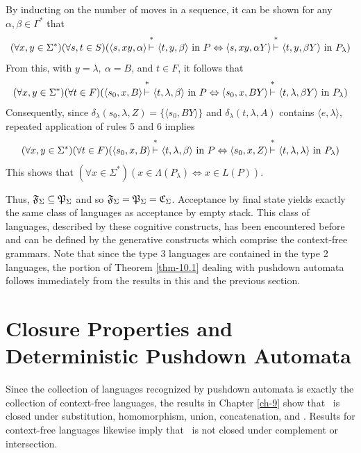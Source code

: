 \begin{thm}
By inducting on the number of moves in a sequence, it can be shown for any
$\alpha,\beta\in\Gamma^*$ that
\[ (\forall x,y\in\Sigma^*)(\forall s,t\in S)(\langle s,xy,\alpha\rangle\Dvdash
	\langle t,y,\beta\rangle\text{ in }P \Leftrightarrow \langle s,xy,\alpha Y\rangle
	\Dvdash\langle t,y,\beta Y\rangle\text{ in }P_{\lambda}) \]
From this, with $y=\lambda,\ \alpha = B$, and $t\in F$, it follows that
\[ (\forall x,y\in\Sigma^*)(\forall t\in F)(\langle s_0,x,B\rangle\Dvdash\langle
	t,\lambda,\beta\rangle\text{ in }P\Leftrightarrow\langle s_0,x,BY\rangle
	\Dvdash\langle t,\lambda,\beta Y\rangle\text{ in }P_{\lambda}) \]
Consequently, since $\delta_{\lambda}(s_0,\lambda,Z)=\{\langle s_0, BY\rangle\}$
and $\delta_{\lambda}(t,\lambda,A)$ contains $\langle e,\lambda\rangle$, repeated application
of rules 5 and 6 implies
\[ (\forall x,y\in\Sigma^*)(\forall t\in F)(\langle s_0,x,B\rangle\Dvdash\langle
	t,\lambda,\beta\rangle\text{ in }P\Leftrightarrow\langle s_0,x,Z\rangle\Dvdash
	\langle t,\lambda,\lambda\rangle\text{ in }P_{\lambda}) \]
This shows that $(\forall x\in\Sigma^*)(x\in \Lambda(P_{\lambda})\Leftrightarrow
x\in L(P))$.
\end{thm}

Thus, $\mathfrak{F}_\Sigma\subseteq\mathfrak{P}_\Sigma$ and so $\mathfrak{F}_\Sigma=\mathfrak{P}_\Sigma=\mathfrak{C}_\Sigma$. Acceptance by final
state yields exactly the same class of languages as acceptance by empty stack.
This class of languages, described by these cognitive constructs, has been
encountered before and can be defined by the generative constructs which
comprise the context-free grammars. Note that since the type 3 languages are
contained in the type 2 languages, the portion of Theorem \ref{thm-10.1} dealing with
pushdown automata follows immediately from the results in this and the previous
section.

\section{Closure Properties and Deterministic Pushdown Automata}\label{sec-10.4}

Since the collection of languages recognized by pushdown automata is exactly the
collection of context-free languages, the results in Chapter \ref{ch-9} show that \PSIG\ 
is closed under substitution, homomorphism, union, concatenation, and \Index{Kleene
closure}. Results for context-free languages likewise imply that \PSIG\ is not
closed under complement or intersection.

